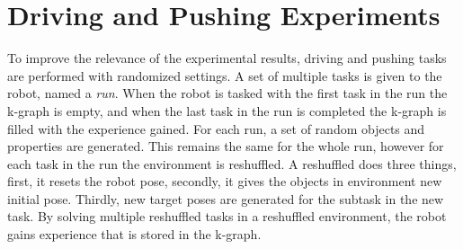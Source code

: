 %
%
%
%

\section{Driving and Pushing Experiments}%
\label{sec:randomization}
To improve the relevance of the experimental results, driving and pushing tasks are performed with randomized settings. A set of multiple tasks is given to the robot, named a \textit{run}. When the robot is tasked with the first task in the run the \ac{k-graph} is empty, and when the last task in the run is completed the \ac{k-graph} is filled with the experience gained. For each run, a set of random objects and properties are generated. This remains the same for the whole run, however for each task in the run the environment is reshuffled. A reshuffled does three things, first, it resets the robot pose, secondly, it gives the objects in environment new initial pose. Thirdly, new target poses are generated for the subtask in the new task. By solving multiple reshuffled tasks in a reshuffled environment, the robot gains experience that is stored in the \ac{k-graph}.\bs

